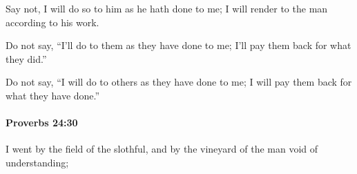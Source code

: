 			\begin{versebox}
					\item[BHS] 
					\item[ASV] Say not, I will do so to him as he hath done to me; I will render to the man according to his work.
					\item[NIV] Do not say, “I’ll do to them as they have done to me; I’ll pay them back for what they did.”
					\item[NRSV] Do not say, “I will do to others as they have done to me; I will pay them back for what they have done.”
			\end{versebox}

		\paragraph{Proverbs 24:30} %
			\label{PROVERBS-24-30}

			I went by the field of the slothful, and by the vineyard of the man void of understanding;

